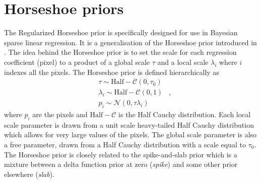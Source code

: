 \documentclass[12pt,dvipsnames]{report}
\newcommand{\hquad}{~~}
\begin{document}
\chapter{Horseshoe priors}
\label{app:horseshoe}
The Regularized Horseshoe prior \citep{10.1214/17-EJS1337SI} is specifically designed for use in Bayesian 
sparse linear regression. 
It is a generalisation of the Horseshoe prior introduced in \citet{carvalho2010}.
The idea behind the Horseshoe prior is to set the scale for each regression coefficient 
(pixel) to a product of a global scale $\tau$ and a local scale $\lambda_i$ where $i$ indexes all the pixels.
The Horseshoe prior is defined hierarchically as 
\begin{equation}
\begin{aligned}
    &\tau  \sim \mathrm{Half}-\mathcal{C} \left(0, \tau_{0}\right)\\
    &\lambda_{i}  \sim \mathrm{Half}-\mathcal{C} (0,1) \\
    &p_{i}  \sim \mathcal{N}\left(0, \tau \lambda_{i}\right) 
\end{aligned}
    \hquad,
    \label{eq:horseshoe}
\end{equation}
where $p_i$ are the pixels and $\mathrm{Half}-\mathcal{C}$ is the Half Cauchy distribution.
Each local scale parameter is drawn from a unit scale heavy-tailed Half Cauchy distribution which allows for very large values of the pixels.
The global scale parameter is also a free parameter, drawn from a Half Cauchy distribution with a scale equal to $\tau_0$.
The Horseshoe prior is closely related to the spike-and-slab prior which is a mixture between a delta function prior at zero (\emph{spike}) and some other prior elsewhere (\emph{slab}).
\end{document}
